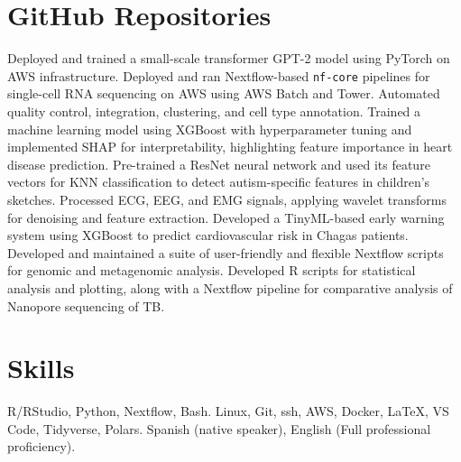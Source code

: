 \documentclass[11pt,a4paper,sans]{moderncv}
\begin{document}
  
\section{GitHub Repositories}
    {Deployed and trained a small-scale transformer GPT-2 model using PyTorch on AWS infrastructure.}{}{}
    {}
    {Deployed and ran Nextflow-based \texttt{nf-core} pipelines for single-cell RNA sequencing on AWS using AWS Batch and Tower. Automated quality control, integration, clustering, and cell type annotation.}{}{}
    {}
    {Trained a machine learning model using XGBoost with hyperparameter tuning and implemented SHAP for interpretability, highlighting feature importance in heart disease prediction.}{}{}
    {}  
    {Pre-trained a ResNet neural network and used its feature vectors for KNN classification to detect autism-specific features in children's sketches.}{}{}
    {}
    {Processed ECG, EEG, and EMG signals, applying wavelet transforms for denoising and feature extraction. Developed a TinyML-based early warning system using XGBoost to predict cardiovascular risk in Chagas patients.}{}{}
    {}
    {Developed and maintained a suite of user-friendly and flexible Nextflow scripts for genomic and metagenomic analysis.}{}{}
    {}
    {Developed R scripts for statistical analysis and plotting, along with a Nextflow pipeline for comparative analysis of Nanopore sequencing of TB.}{}{}
    {}

\section{Skills}
  {}{}{R/RStudio, Python, Nextflow, Bash.}
  {}
  {}{Linux, Git, ssh, AWS, Docker, LaTeX, VS Code, Tidyverse, Polars.}{}
  {}
  {}{Spanish (native speaker), English (Full professional proficiency).}
  {}
  {}
\end{document}
